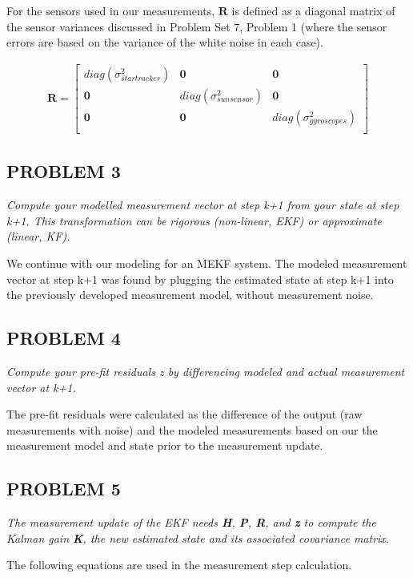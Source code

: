For the sensors used in our measurements, $\mathbf{R}$ is defined as a diagonal matrix of the sensor variances discussed in Problem Set 7, Problem 1 (where the sensor errors are based on the variance of the white noise in each case).

\begin{align*}
    \mathbf{R} = 
    \begin{bmatrix}
        diag(\sigma_{star tracker}^2) & \mathbf{0} & \mathbf{0} \\
        \mathbf{0} & diag(\sigma_{sun sensor}^2) & \mathbf{0} \\
        \mathbf{0} & \mathbf{0} & diag(\sigma_{gyroscopes}^2)\\
    \end{bmatrix}
\end{align*}

\subsection{PROBLEM 3}
\textit{Compute your modelled measurement vector at step k+1 from your state at step k+1. 
This transformation can be rigorous (non-linear, EKF) or approximate (linear, KF).}

We continue with our modeling for an MEKF system. The modeled measurement vector at step k+1 was found by plugging the estimated state at step k+1 into the previously developed measurement model, without measurement noise.

\subsection{PROBLEM 4}
\textit{Compute your pre-fit residuals \textit{z} by differencing modeled and actual measurement vector at k+1.}

The pre-fit residuals were calculated as the difference of the output (raw measurements with noise) and the modeled measurements based on our the measurement model and state prior to the measurement update.

\subsection{PROBLEM 5}
\textit{The measurement update of the EKF needs \textbf{H}, \textbf{P}, \textbf{R}, and \textbf{z} to compute the Kalman gain \textbf{K}, the new estimated state and its associated covariance matrix.}

The following equations are used in the measurement step calculation.

